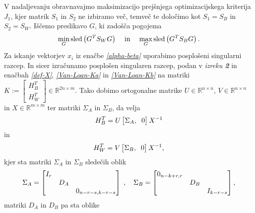 \documentclass[mat1]{article}
\theoremstyle{definition}
\begin{document}
V nadaljevanju obravnavajmo maksimizacijo prejšnjega optimizacijskega kriterija $J_1$, kjer matrik $S_1$ in $S_2$ ne izbiramo več, temveč te določimo kot $S_1 = S_B$ in $S_2 = S_W$. Iščemo preslikavo $G$, ki zadošča pogojema
\begin{equation} \label{pogoji-G}
\min_G \text{sled} \left( G^T S_W G \right)
\hspace{4mm}
\text{in}
\hspace{4mm}
\max_G \text{sled} \left( G^T S_B G \right)
\text{.}
\end{equation}
Za iskanje vektorjev $x_i$ iz enačbe \textit{\eqref{alpha-beta}} uporabimo posplošeni singularni razcep. In sicer izračunamo posplošen singularen razcep, podan v \textsl{izreku \textbf{2}} in enačbah \textit{\eqref{def-X}}, \textit{\eqref{Van-Loan-Ka}} in \textit{\eqref{Van-Loan-Kb}} na matriki 
$K := 
\begin{bmatrix}
H_B^T \\
H_W^T
\end{bmatrix}
\in \mathbb{R}^{2n \times m}$.
Tako dobimo ortogonalne matrike $U \in \mathbb{R}^{n \times n}$, $V \in \mathbb{R}^{n \times n}$ in $X \in \mathbb{R}^{m \times m}$ ter matriki $\Sigma_A$ in $\Sigma_B$, da velja
\begin{equation} \label{exp-H_b}
H_B^T = U 
\begin{bmatrix}
\Sigma_A, \hspace{2mm} 0 
\end{bmatrix} X^{-1}
\end{equation}
in
\begin{equation} \label{exp-H_w}
H_W^T = V 
\begin{bmatrix}
\Sigma_B, \hspace{2mm} 0 
\end{bmatrix} X^{-1}
\text{,}
\end{equation}
kjer sta matriki $\Sigma_A$ in $\Sigma_B$ sledečih oblik
$$
\Sigma_A = 
\begin{bmatrix} 
I_r &  & \\
 & D_A & \\
 & & 0_{n-r-s, k-r-s}  
\end{bmatrix}
\hspace{1mm}
\text{,}
\hspace{4mm}
\Sigma_B =
\begin{bmatrix}
0_{n-k+r, r} & & \\ 
 & D_B & \\ 
 & & I_{k-r-s}
\end{bmatrix} \text{,}
$$ matriki $D_A$ in $D_B$ pa sta oblike
\end{document}
